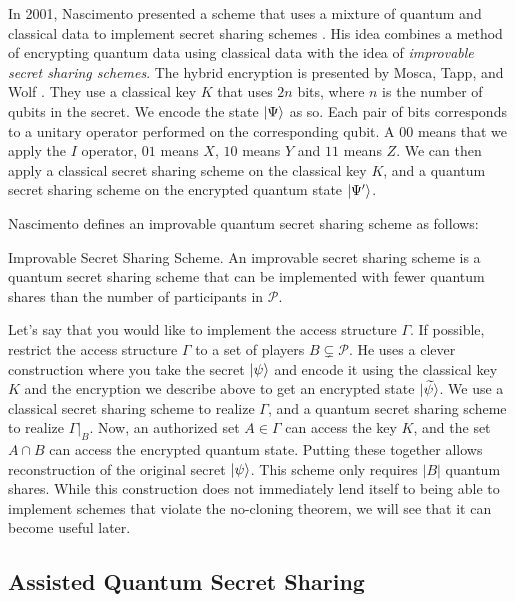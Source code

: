 In 2001, Nascimento presented a scheme that uses a mixture of quantum and classical data to implement secret sharing schemes \cite{nascimento_improving_2001}. His idea combines a method of encrypting quantum data using classical data with the idea of \textit{improvable secret sharing schemes}. The hybrid encryption is presented by Mosca, Tapp, and Wolf \cite{mosca2000private}. They use a classical key $K$ that uses $2n$ bits, where $n$ is the number of qubits in the secret. We encode the state $\ket{\Psi}$ as so. Each pair of bits corresponds to a unitary operator performed on the corresponding qubit. A $00$ means that we apply the $I$ operator, $01$ means $X$, $10$ means $Y$ and $11$ means $Z$. We can then apply a classical secret sharing scheme on the classical key $K$, and a quantum secret sharing scheme on the encrypted quantum state $\ket{\Psi '}$.

Nascimento defines an improvable quantum secret sharing scheme as follows:

\begin{definition}{Improvable Secret Sharing Scheme.}
    \label{defn:improvable}
    An improvable secret sharing scheme is a quantum secret sharing scheme that can be implemented with fewer quantum shares than the number of participants in $\mathcal{P}$.
\end{definition}

Let's say that you would like to implement the access structure $\Gamma$. If possible, restrict the access structure $\Gamma$ to a set of players $B \subsetneq \mathcal{P}$. He uses a clever construction where you take the secret $\ket{\psi}$ and encode it using the classical key $K$ and the encryption we describe above to get an encrypted state $\ket{\widetilde{\psi}}$. We use a classical secret sharing scheme to realize $\Gamma$, and a quantum secret sharing scheme to realize $\Gamma |_B$. Now, an authorized set $A \in \Gamma$ can access the key $K$, and the set $A \cap B$ can access the encrypted quantum state. Putting these together allows reconstruction of the original secret $\ket{\psi}$. This scheme only requires $|B|$ quantum shares. While this construction does not immediately lend itself to being able to implement schemes that violate the no-cloning theorem, we will see that it can become useful later.

\subsection{Assisted Quantum Secret Sharing}
\label{ssec:aqss}

